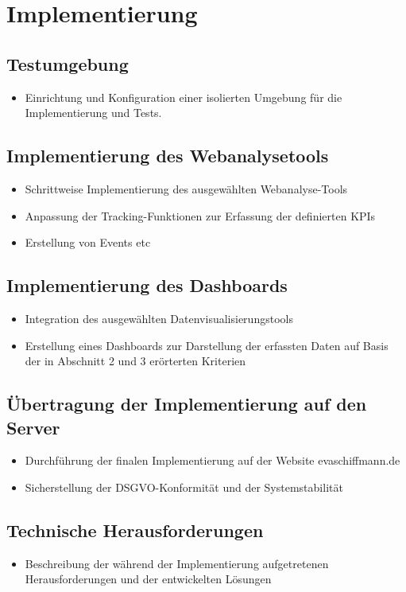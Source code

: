 \chapter{Implementierung}
\label{ch:implementierung}

\section{Testumgebung}
\begin{itemize}
    \item Einrichtung und Konfiguration einer isolierten Umgebung für die Implementierung und Tests.
\end{itemize}

\section{Implementierung des Webanalysetools}
\begin{itemize}
    \item Schrittweise Implementierung des ausgewählten Webanalyse-Tools
    \item Anpassung der Tracking-Funktionen zur Erfassung der definierten KPIs
    \item Erstellung von Events etc
\end{itemize}

\section{Implementierung des Dashboards}
\begin{itemize}
    \item Integration des ausgewählten Datenvisualisierungstools
    \item Erstellung eines Dashboards zur Darstellung der erfassten Daten auf Basis der in Abschnitt 2 und 3 erörterten Kriterien
\end{itemize}

\section{Übertragung der Implementierung auf den Server}
\begin{itemize}
    \item Durchführung der finalen Implementierung auf der Website evaschiffmann.de
    \item Sicherstellung der DSGVO-Konformität und der Systemstabilität
\end{itemize}

\section{Technische Herausforderungen}
\begin{itemize}
    \item Beschreibung der während der Implementierung aufgetretenen Herausforderungen und der entwickelten Lösungen
\end{itemize}